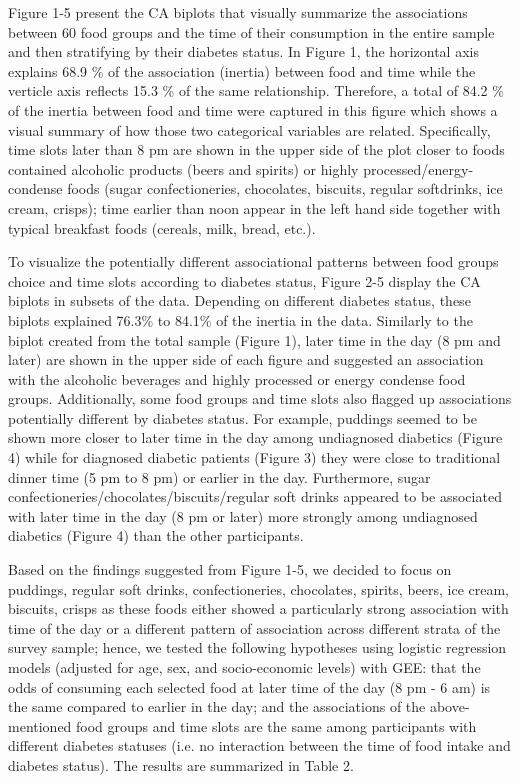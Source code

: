 \documentclass{bmcart}
\begin{document}
Figure 1-5 present the CA biplots that visually summarize the associations between 60 food groups and the time of their consumption in the entire sample and then stratifying by their diabetes status. In Figure 1, the horizontal axis explains 68.9 \% of the association (inertia) between food and time while the verticle axis reflects 15.3 \% of the same relationship. Therefore, a total of 84.2 \% of the inertia between food and time were captured in this figure which shows a visual summary of how those two categorical variables are related. Specifically, time slots later than 8 pm are shown in the upper side of the plot closer to foods contained alcoholic products (beers and spirits) or highly processed/energy-condense foods (sugar confectioneries, chocolates, biscuits, regular softdrinks, ice cream, crisps); time earlier than  noon appear in the left hand side together with typical breakfast foods (cereals, milk, bread, etc.).

To visualize the potentially different associational patterns between food groups choice and time slots according to diabetes status, Figure 2-5 display the CA biplots in subsets of the data. Depending on different diabetes status, these biplots explained 76.3\% to 84.1\% of the inertia in the data. Similarly to the biplot created from the total sample (Figure 1), later time in the day (8 pm and later) are shown in the upper side of each figure and suggested an association with the alcoholic beverages and highly processed or energy condense food groups. Additionally, some food groups and time slots also flagged up associations potentially different by diabetes status. For example, puddings seemed to be shown more closer to later time in the day among undiagnosed diabetics (Figure 4) while for diagnosed diabetic patients (Figure 3) they were close to traditional dinner time (5 pm to 8 pm) or earlier in the day. Furthermore, sugar confectioneries/chocolates/biscuits/regular soft drinks appeared to be associated with later time in the day (8 pm or later) more strongly among undiagnosed diabetics (Figure 4) than the other participants.

Based on the findings suggested from Figure 1-5, we decided to focus on puddings, regular soft drinks, confectioneries, chocolates, spirits, beers, ice cream, biscuits, crisps as these foods either showed a particularly strong association with time of the day or a different pattern of association across different strata of the survey sample; hence, we tested the following hypotheses using logistic regression models (adjusted for age, sex, and socio-economic levels) with GEE: that the odds of consuming each selected food at later time of the day (8 pm - 6 am) is the same compared to earlier in the day; and the associations of the above-mentioned food groups and time slots are the same among participants with different diabetes statuses (i.e. no interaction between the time of food intake and diabetes status). The results are summarized in Table 2. 
\end{document}
